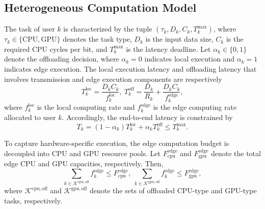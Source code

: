 \documentclass[conference]{IEEEtran}
\begin{document}

\subsection{Heterogeneous Computation Model}

The task of user $k$ is characterized by the tuple
$\left(\tau_k, D_k, C_k, T_k^{\max}\right)$,
where $\tau_k\in\{\mathrm{CPU},\mathrm{GPU}\}$ denotes the task type, $D_k$ is the input data size, $C_k$ is the required CPU cycles per bit, and $T_k^{\max}$ is the latency deadline.
Let $\alpha_k\in\{0,1\}$ denote the offloading decision, where $\alpha_k=0$ indicates local execution and $\alpha_k=1$ indicates edge execution. The local execution latency and offloading latency that involves transmission and edge execution components are respectively 
\begin{equation}
T_k^{\mathrm{loc}}=\frac{D_k C_k}{f_k^{\mathrm{loc}}},~T_k^{\mathrm{off}}=\frac{D_k}{R_k} + \frac{D_k C_k}{f_k^{\mathrm{edge}}},
\end{equation}
where $f_k^{\mathrm{loc}}$ is the local computing rate and $f_k^\mathrm{edge}$ is the edge computing rate allocated to user $k$.
Accordingly, the end-to-end latency is constrained by 
\begin{equation}
T_k=(1-\alpha_k)T_k^{\mathrm{loc}}+\alpha_kT_k^{\mathrm{off}}\le T_k^\mathrm{max}.
\end{equation}

To capture hardware-specific execution, the edge computation budget is decoupled into CPU and GPU resource pools. Let $F_{\mathrm{cpu}}^{\mathrm{edge}}$ and $F_{\mathrm{gpu}}^{\mathrm{edge}}$ denote the total edge CPU and GPU capacities, respectively. Then,
\begin{equation}
\sum_{k\in\mathcal{K}^{\mathrm{cpu,off}}} f_k^{\mathrm{edge}}\leq F_{\mathrm{cpu}}^{\mathrm{edge}},\;
\sum_{k\in\mathcal{K}^{\mathrm{gpu,off}}} f_k^{\mathrm{edge}}\leq F_{\mathrm{gpu}}^{\mathrm{edge}},
\end{equation}
where $\mathcal{K}^{\mathrm{cpu,off}}$ and $\mathcal{K}^{\mathrm{gpu,off}}$ denote the sets of offloaded CPU-type and GPU-type tasks, respectively.
\end{document}
